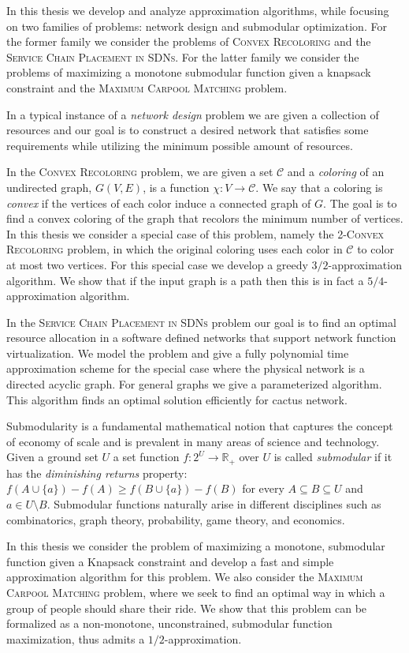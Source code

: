 In this thesis we develop and analyze approximation algorithms, while focusing on two families of problems: network design and submodular optimization.
For the former family we consider the problems of \textsc{Convex Recoloring} and the \textsc{Service Chain Placement in SDNs}.
For the latter family we consider the problems of maximizing a monotone submodular function given a knapsack constraint and the \textsc{Maximum Carpool Matching} problem.

In a typical instance of a \emph{network design} problem we are given a collection of resources and our goal is to construct a desired network that satisfies some requirements while utilizing the minimum possible amount of resources.

In the \textsc{Convex Recoloring} problem, we are given a set $\mathcal{C}$ and a \emph{coloring} of an undirected graph, $G(V, E)$, is a function $\chi:V \to \mathcal{C}$.
We say that a coloring is \emph{convex} if the vertices of each color induce a connected graph of $G$.
The goal is to find a convex coloring of the graph that recolors the minimum number of vertices.
In this thesis we consider a special case of this problem, namely the \textsc{2-Convex Recoloring} problem, in which the original coloring uses each color in $\mathcal{C}$ to color at most two vertices.
For this special case we develop a greedy $3/2$-approximation algorithm.
We show that if the input graph is a path then this is in fact a $5/4$-approximation algorithm.

In the \textsc{Service Chain Placement in SDNs} problem our goal is to find an optimal resource allocation in a software defined networks that support network function virtualization.
We model the problem and give a fully polynomial time approximation scheme for the special case where the physical network is a directed acyclic graph. 
For general graphs we give a parameterized algorithm. 
This algorithm finds an optimal solution efficiently for cactus network.

Submodularity is a fundamental mathematical notion that captures the concept of economy of scale and is prevalent in many areas of science and technology.
Given a ground set $U$ a set function $f:2^U \to \mathbb{R}_+$ over $U$ is called \emph{submodular} if it has the \emph{diminishing returns} property:
$f(A \cup \{a\}) - f(A) \geq f(B \cup \{a\}) - f(B)$ for every $A \subseteq B \subseteq U$ and $a \in U \setminus B$.
Submodular functions naturally arise in different disciplines such as combinatorics, graph theory, probability, game theory, and economics.

In this thesis we consider the problem of maximizing a monotone, submodular function given a Knapsack constraint and develop a fast and simple approximation algorithm for this problem.
We also consider the \textsc{Maximum Carpool Matching} problem, where we seek to find an optimal way in which a group of people should share their ride. 
We show that this problem can be formalized as a non-monotone, unconstrained, submodular function maximization, thus admits a $1/2$-approximation.